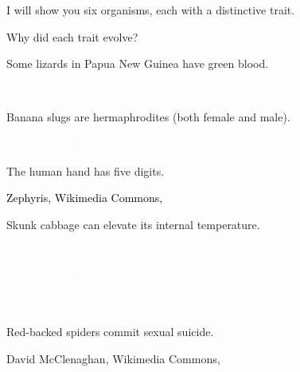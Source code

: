 \documentclass[t]{beamer}
\begin{document}
%
%
\begin{frame}{I will show you six organisms, each with a distinctive trait.}

\hangpara {} Why did each trait evolve?

\end{frame}
%
{
\begin{frame}[t]{Some lizards in Papua New Guinea have \textcolor{green6}{green} blood.}

\vfilll 

\hfill \textcolor{white}{\tiny \copyright~Christoper Austin}
\end{frame}
}
%
{
\begin{frame}[t]{Banana slugs are hermaphrodites (both female and male).}

\vfilll 

\hfill \textcolor{white}{\tiny Ben Stanfield, Flickr, }
\end{frame}
}
%
{
\begin{frame}[t]{The human hand has five digits.}

\vfilll 

\hfill \textcolor{black}{\tiny Zephyris, Wikimedia Commons, }
\end{frame}
}
%
{
\begin{frame}[t]{Skunk cabbage can elevate its internal temperature.}

\vfilll 

\tiny \textcolor{white}{dogtooth77, Flick, }
\end{frame}
}
%
{
\begin{frame}[t]{\textcolor{white}{Male anglerfish bite and fuse to the body of the female.}}

\vfilll 

\hfill\tiny\textcolor{white}{\textcopyright\,Theodore W. Pietsch, University of Washington.}
\end{frame}
}
%
{
\begin{frame}[t]{Red-backed spiders commit sexual suicide.}

\vfilll 

\hfill \tiny David McClenaghan, Wikimedia Commons, 
\end{frame}
}
\end{document}
